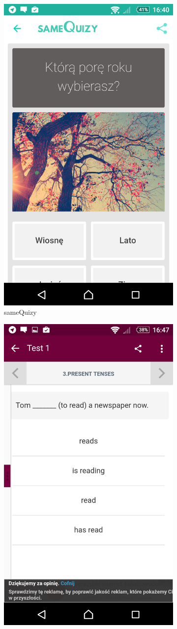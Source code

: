 \documentclass{report}
\begin{document}
\begin{figure}[ht]
\begin{subfigure}{.3\textwidth}
				\includegraphics[width=.7\linewidth]{sameQuizy.png}
				\caption{sameQuizy}
				\label{fig:same_quizy}
			\end{subfigure}
			\begin{subfigure}{.3\textwidth}
				\centering
				\includegraphics[width=.7\linewidth]{English_Grammar_Test.png}

\end{subfigure}
\end{figure}
\end{document}
